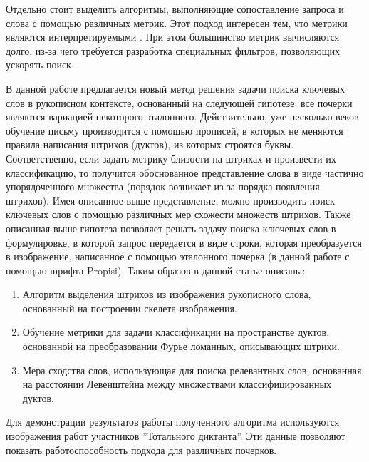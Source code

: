 \documentclass{article}
\begin{document}
\par Отдельно стоит выделить алгоритмы, выполняющие сопоставление запроса и слова с помощью различных метрик. Этот подход интересен тем, что метрики являются интерпретируемыми \citep{ameri2017keyword, 10.1007/978-3-319-49055-7_50}. При этом большинство метрик вычисляются долго, из-за чего требуется разработка специальных фильтров, позволяющих ускорять поиск \citep{stauffer2020filters}.
\par В данной работе предлагается новый метод решения задачи поиска ключевых слов в рукописном контексте, основанный на следующей гипотезе: все почерки являются вариацией некоторого эталонного. Действительно, уже несколько веков обучение письму производится с помощью прописей, в которых не меняются правила написания штрихов (дуктов), из которых строятся буквы. Соответственно, если задать метрику близости на штрихах и произвести их классификацию, то получится обоснованное представление слова в виде частично упорядоченного множества (порядок возникает из-за порядка появления штрихов). Имея описанное выше представление, можно производить поиск ключевых слов с помощью различных мер схожести множеств штрихов. Также описанная выше гипотеза позволяет решать задачу поиска ключевых слов в формулировке, в которой запрос передается в виде строки, которая преобразуется в изображение, написанное с помощью эталонного почерка (в данной работе с помощью шрифта Propisi). Таким образов в данной статье описаны:
\begin{enumerate}
\item Алгоритм выделения штрихов из изображения рукописного слова, основанный на построении скелета изображения.
\item Обучение метрики для задачи классификации на пространстве дуктов, основанной на преобразовании Фурье ломанных, описывающих штрихи.
\item Мера сходства слов, использующая для поиска релевантных слов, основанная на расстоянии Левенштейна между множествами классифицированных дуктов.
\end{enumerate}
\par Для демонстрации результатов работы полученного алгоритма используются изображения работ участников ''Тотального диктанта''. Эти данные позволяют показать работоспособность подхода для различных почерков.

\end{document}
